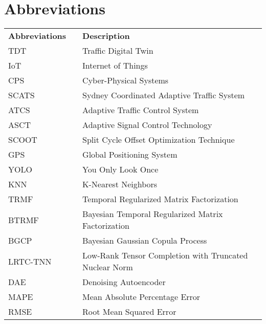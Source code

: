 \newpage
\chapter*{\centering Abbreviations}
\begin{center}
\begin{longtable}{lll} 
\textbf{Abbreviations}& & \textbf{Description} \\ 
TDT & & Traffic Digital Twin \\
IoT & & Internet of Things \\
CPS & & Cyber-Physical Systems \\
SCATS & & Sydney Coordinated Adaptive Traffic System \\
ATCS & & Adaptive Traffic Control System \\
ASCT & & Adaptive Signal Control Technology \\
SCOOT & & Split Cycle Offset Optimization Technique \\
GPS & & Global Positioning System \\
YOLO & & You Only Look Once \\
KNN & & K-Nearest Neighbors \\
TRMF & & Temporal Regularized Matrix Factorization \\
BTRMF & & Bayesian Temporal Regularized Matrix Factorization \\
BGCP & & Bayesian Gaussian Copula Process \\
LRTC-TNN & & Low-Rank Tensor Completion with Truncated Nuclear Norm \\
DAE & & Denoising Autoencoder \\
MAPE & & Mean Absolute Percentage Error \\
RMSE & & Root Mean Squared Error \\
\end{longtable}
\end{center}
